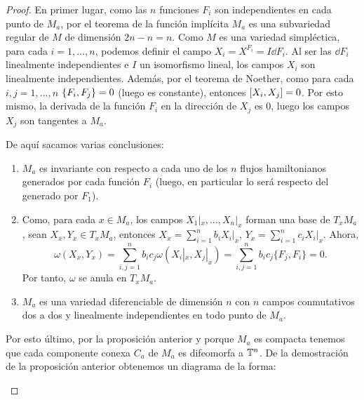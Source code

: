 \begin{proof}
  En primer lugar, como las $n$ funciones $F_i$ son independientes en cada punto de $M_a$, por el teorema de la función implícita $M_a$ es una subvariedad regular de $M$ de dimensión $2n-n=n$. 
  Como $M$ es una variedad simpléctica, para cada $i=1,\dots,n$, podemos definir el campo $X_i=X^{F_i}=I \dd F_i$. Al ser las $\dd F_i$ linealmente independientes e $I$ un isomorfismo lineal, los campos $X_i$ son linealmente independientes. Además, por el teorema de Noether, como para cada $i,j= 1,\dots,n$ $\left\lbrace F_i,F_j\right\rbrace=0$ (luego es constante), entonces $\left[X_i,X_j\right]=0$. Por esto mismo, la derivada de la función $F_i$ en la dirección de $X_j$ es 0, luego los campos $X_j$ son tangentes a $M_a$.

  De aquí sacamos varias conclusiones:
  \begin{enumerate}
    \item $M_a$ es invariante con respecto a cada uno de los $n$ flujos hamiltonianos generados por cada función $F_i$ (luego, en particular lo será respecto del generado por $F_1$).
    \item Como, para cada $x \in M_a$, los campos $X_1|_x,\dots, X_n|_x$ forman una base de $T_x M_a$, sean $X_x, Y_x \in T_x M_a$, entonces $X_x = \sum_{i=1}^n b_i X_i|_x$, $Y_x=\sum_{i=1}^n c_i X_i|_x$. Ahora,
      \[
	\omega(X_x,Y_x)= \sum_{i,j=1}^n b_i c_j \omega(X_i|_x,X_j|_x) = \sum_{i,j=1}^n b_i c_j \{F_j,F_i\} = 0.
      \]
      Por tanto, $\omega$ se anula en $T_x M_a$. 
    \item $M_a$ es una variedad diferenciable de dimensión $n$ con $n$ campos conmutativos dos a dos y linealmente independientes en todo punto de $M_a$. 
  \end{enumerate}

Por esto último, por la proposición anterior y porque $M_a$ es compacta tenemos que cada componente conexa $C_a$ de $M_a$ es difeomorfa a $\mathbb{T}^n$. De la demostración de la proposición anterior obtenemos un diagrama de la forma:

\begin{center}
\end{center}



\end{proof}
